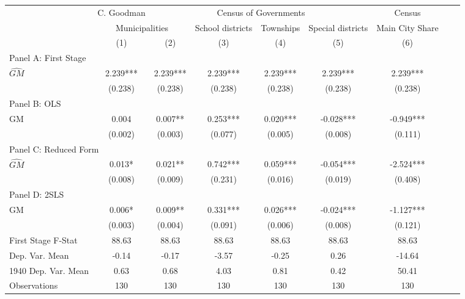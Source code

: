  \begin{tabular}{l*{8}{c}} \toprule
&\multicolumn{1}{c}{C. Goodman}&\multicolumn{4}{c}{Census of Governments}&\multicolumn{1}{c}{Census}\\\cmidrule(lr){2-2}\cmidrule(lr){3-6}\cmidrule(lr){7-7}
&\multicolumn{2}{c}{Municipalities}&\multicolumn{1}{c}{School districts}&\multicolumn{1}{c}{Townships}&\multicolumn{1}{c}{Special districts}&\multicolumn{1}{c}{Main City Share}\\\cmidrule(lr){2-3}\cmidrule(lr){4-6}\cmidrule(lr){7-7}
&\multicolumn{1}{c}{(1)}&\multicolumn{1}{c}{(2)}&\multicolumn{1}{c}{(3)}&\multicolumn{1}{c}{(4)}&\multicolumn{1}{c}{(5)}&\multicolumn{1}{c}{(6)}\\
\cmidrule(lr){1-7}
\multicolumn{6}{l}{Panel A: First Stage}\\
\cmidrule(lr){1-7}
$\widehat{GM}$  &    2.239***&    2.239***&    2.239***&    2.239***&    2.239***&    2.239***\\
                &  (0.238)   &  (0.238)   &  (0.238)   &  (0.238)   &  (0.238)   &  (0.238)   \\
\cmidrule(lr){1-7}
\multicolumn{6}{l}{Panel B: OLS}\\
\cmidrule(lr){1-7}
GM              &    0.004   &    0.007** &    0.253***&    0.020***&   -0.028***&   -0.949***\\
                &  (0.002)   &  (0.003)   &  (0.077)   &  (0.005)   &  (0.008)   &  (0.111)   \\
\cmidrule(lr){1-7}
\multicolumn{6}{l}{Panel C: Reduced Form}\\
\cmidrule(lr){1-7}
$\widehat{GM}$  &    0.013*  &    0.021** &    0.742***&    0.059***&   -0.054***&   -2.524***\\
                &  (0.008)   &  (0.009)   &  (0.231)   &  (0.016)   &  (0.019)   &  (0.408)   \\
\cmidrule(lr){1-7}
\multicolumn{6}{l}{Panel D: 2SLS}\\
\cmidrule(lr){1-7}
GM              &    0.006*  &    0.009** &    0.331***&    0.026***&   -0.024***&   -1.127***\\
                &  (0.003)   &  (0.004)   &  (0.091)   &  (0.006)   &  (0.008)   &  (0.121)   \\
\midrule
First Stage F-Stat&    88.63   &    88.63   &    88.63   &    88.63   &    88.63   &    88.63   \\
Dep. Var. Mean  &    -0.14   &    -0.17   &    -3.57   &    -0.25   &     0.26   &   -14.64   \\
1940 Dep. Var. Mean&     0.63   &     0.68   &     4.03   &     0.81   &     0.42   &    50.41   \\
Observations    &      130   &      130   &      130   &      130   &      130   &      130   \\
       \bottomrule \end{tabular}
